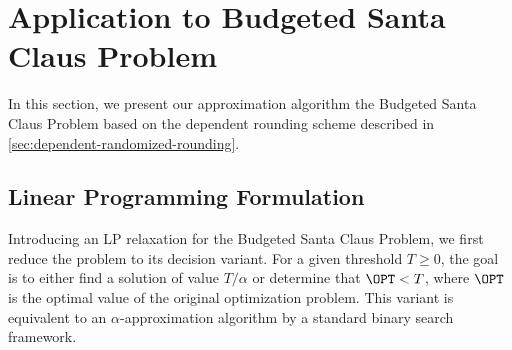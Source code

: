 \section{Application to Budgeted Santa Claus Problem}
\label{sec:santa-claus}

In this section, we present our approximation algorithm the Budgeted Santa Claus Problem based on the dependent rounding scheme described in \cref{sec:dependent-randomized-rounding}.

\subsection{Linear Programming Formulation}
\label{subsec:lp}
Introducing an LP relaxation for the Budgeted Santa Claus Problem,  we first reduce the problem to its decision variant.
For a given threshold $T \ge 0$, the goal is to either
find a solution of value $T/ \alpha$ or determine that
$\OPT < T$, where $\OPT$ is the optimal value of the original optimization problem. This variant is equivalent to an
$\alpha$-approximation algorithm by a standard
binary search framework. 

